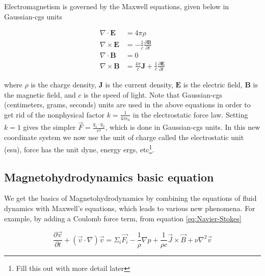 \documentclass{article}
\begin{document}
Electromagnetism is governed by the Maxwell equations, given below in Gaussian-cgs units

\begin{align}\label{eq:Maxwells}
    \nabla \cdot \mathbf{E} &= 4\pi\rho \\
    \nabla \times \mathbf{E} &= -\frac{1}{c} \frac{\partial \mathbf{B}}{\partial t}\label{eq:Maxwell grad E} \\
    \nabla \cdot \mathbf{B} &= 0 \\
    \nabla \times \mathbf{B} &= \frac{4\pi}{c} \mathbf{J} + \frac{1}{c} \frac{\partial \mathbf{E}}{\partial t}\label{eq:Maxwell Partial E}
\end{align}

where $\rho$ is the charge density, $\mathbf{J}$ is the current density, $\mathbf{E}$ is the electric field, $\mathbf{B}$ is the magnetic field, and $c$ is the speed of light. Note that Gaussian-cgs (centimeters, grams, seconds) units are used in the above equations in order to get rid of the nonphysical factor $k=\frac{1}{4\pi \epsilon_0}$ in the electrostatic force law. Setting $k=1$ gives the simpler $\Vec{F} = \frac{q_1 \cdot q_2}{r^2}$, which is done in Gaussian-cgs units. In this new coordinate system we now use the unit of charge called the electrostatic unit (esu), force has the unit dyne, energy ergs, etc\footnote{Fill this out with more detail later}.


\subsection{Magnetohydrodynamics basic equation}

We get the basics of Magnetohydrodynamics by combining the equations of fluid dynamics with Maxwell's equations, which leads to various new phenomena. For example, by adding a Coulomb force term, from equation \ref{eq:Navier-Stokes}

\begin{equation}\label{eq:Navier-Stokes added in Coulomb}
    \frac{\partial \Vec{v}}{\partial t} + (\Vec{v}\cdot\nabla)\Vec{v} = 
    \Sigma_{i}\Vec{F_i} - 
    \frac{1}{\rho} \nabla p + 
    \frac{1}{\rho c} \Vec{J} \times \Vec{B} +
    \nu \nabla^2 \Vec{v}
\end{equation}
\end{document}
